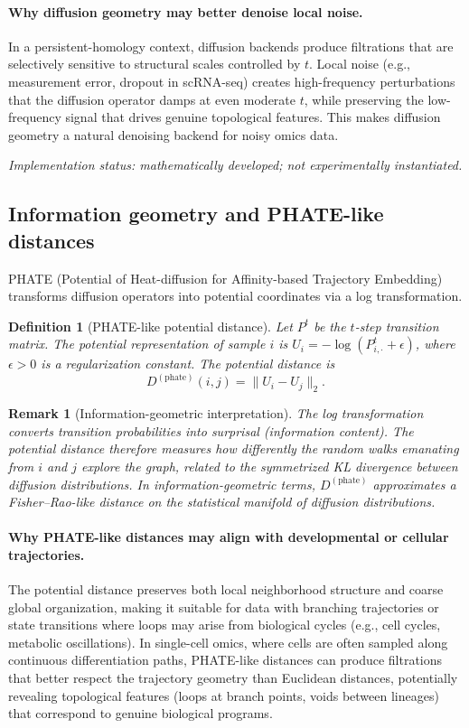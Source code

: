 \documentclass[11pt]{article}
\newtheorem{definition}[theorem]{Definition}
\newtheorem{remark}[theorem]{Remark}
\begin{document}
\paragraph{Why diffusion geometry may better denoise local noise.}
In a persistent-homology context, diffusion backends produce filtrations that are selectively sensitive to structural scales controlled by $t$.
Local noise (e.g., measurement error, dropout in scRNA-seq) creates high-frequency perturbations that the diffusion operator damps at even moderate $t$, while preserving the low-frequency signal that drives genuine topological features.
This makes diffusion geometry a natural denoising backend for noisy omics data.

\emph{Implementation status: mathematically developed; not experimentally instantiated.}

\subsection{Information geometry and PHATE-like distances}
\label{sec:phate}

PHATE (Potential of Heat-diffusion for Affinity-based Trajectory Embedding) \cite{moon2019phate} transforms diffusion operators into potential coordinates via a log transformation.

\begin{definition}[PHATE-like potential distance]\label{def:phate}
Let $P^t$ be the $t$-step transition matrix.
The \emph{potential representation} of sample $i$ is $U_i = -\log(P^t_{i,\cdot} + \epsilon)$, where $\epsilon > 0$ is a regularization constant.
The \emph{potential distance} is
\[
D^{(\text{phate})}(i,j) = \|U_i - U_j\|_2.
\]
\end{definition}

\begin{remark}[Information-geometric interpretation]\label{rem:phate_info}
The log transformation converts transition probabilities into surprisal (information content).
The potential distance therefore measures how differently the random walks emanating from $i$ and $j$ explore the graph, related to the symmetrized KL divergence between diffusion distributions.
In information-geometric terms, $D^{(\text{phate})}$ approximates a Fisher--Rao-like distance on the statistical manifold of diffusion distributions.
\end{remark}

\paragraph{Why PHATE-like distances may align with developmental or cellular trajectories.}
The potential distance preserves both local neighborhood structure and coarse global organization, making it suitable for data with branching trajectories or state transitions where loops may arise from biological cycles (e.g., cell cycles, metabolic oscillations).
In single-cell omics, where cells are often sampled along continuous differentiation paths, PHATE-like distances can produce filtrations that better respect the trajectory geometry than Euclidean distances, potentially revealing topological features (loops at branch points, voids between lineages) that correspond to genuine biological programs.
\end{document}
